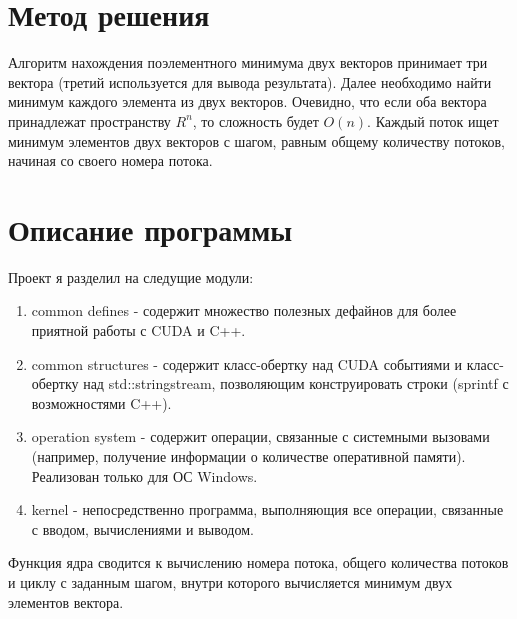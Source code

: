 \section{Метод решения}
Алгоритм нахождения поэлементного минимума двух векторов принимает три вектора (третий используется для вывода результата). 
Далее необходимо найти минимум каждого элемента из двух векторов. Очевидно, что если оба вектора принадлежат пространству $R^n$, то сложность будет $O(n)$.
Каждый поток ищет минимум элементов двух векторов с шагом, равным общему количеству потоков, начиная со своего номера потока.
\section{Описание программы}
Проект я разделил на следущие модули:
\begin{enumerate}
    \item common defines - содержит множество полезных дефайнов для более приятной работы с CUDA и C++.
    \item common structures - содержит класс-обертку над CUDA событиями и класс-обертку над std::stringstream, позволяющим конструировать строки (sprintf с возможностями C++).
    \item operation system - содержит операции, связанные с системными вызовами (например, получение информации о количестве оперативной памяти). Реализован только для ОС Windows.
    \item kernel - непосредственно программа, выполняющия все операции, связанные с вводом, вычислениями и выводом.
\end{enumerate}

Функция ядра сводится к вычислению номера потока, общего количества потоков и циклу с заданным шагом, внутри которого вычисляется минимум двух элементов вектора. 